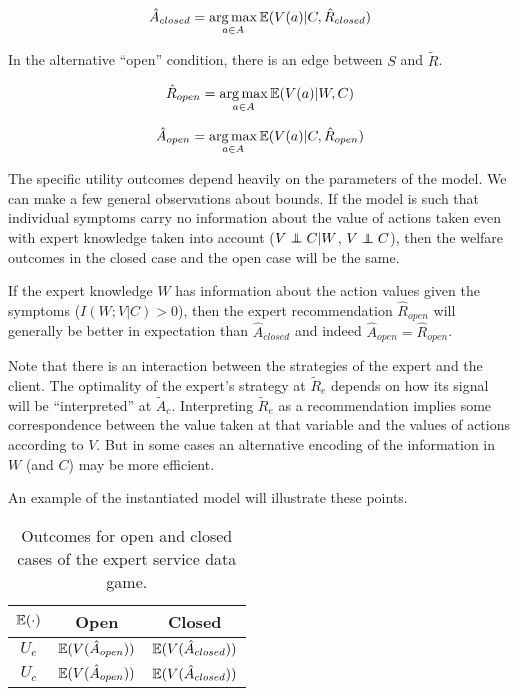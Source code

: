 \documentclass[../thesis.tex]{subfiles}
\begin{document}
$$\hat{A}_{closed} = \operatorname*{arg\,max}_{a \in A} \mathbb{E}(V(a) \vert C, \hat{R}_{closed})$$

In the alternative ``open'' condition, there is an edge between
$S$ and $\tilde{R}$.

$$\hat{R}_{open} = \operatorname*{arg\,max}_{a \in A} \mathbb{E}(V(a) \vert W,C)$$

$$\hat{A}_{open} = \operatorname*{arg\,max}_{a \in A} \mathbb{E}(V(a) \vert C, \hat{R}_{open})$$

The specific utility outcomes depend heavily on the parameters of
the model.
We can make a few general observations about bounds.
If the model is such that individual symptoms carry no
information about the value of actions taken even with expert
knowledge taken into account ($V \independent C \vert W$,
$V \independent C$),
then the welfare outcomes in the closed case and the open case will
be the same.

If the expert knowledge $W$ has information
about the action values given the symptoms ($I(W;V \vert C) > 0$),
then the expert recommendation $\hat{R}_{open}$ will generally be better
in expectation than $\hat{A}_{closed}$ and indeed
$\hat{A}_{open} = \hat{R}_{open}$.

Note that there is an interaction between the strategies of the
expert and the client.
The optimality of the expert's strategy at $\tilde{R}_e$ depends
on how its signal will be ``interpreted'' at $\tilde{A}_c$.
Interpreting $\tilde{R}_e$ as a recommendation implies some
correspondence between the value taken at that variable and
the values of actions according to $V$.
But in some cases an alternative encoding of the information
in $W$ (and $C$) may be more efficient.

An example of the instantiated model will illustrate these points.

\begin{table}
\begin{center}
\begin{tabular}{ |c|c|c| } 
 \hline
  $\mathbb{E}(\cdot)$ & Open  & Closed \\
 \hline
 $U_e$ & $\mathbb{E}(V(\hat{A}_{open}))$ & $\mathbb{E}(V(\hat{A}_{closed}))$ \\ 
 $U_c$ & $\mathbb{E}(V(\hat{A}_{open}))$ & $\mathbb{E}(V(\hat{A}_{closed}))$  \\
 \hline
\end{tabular}
\caption{Outcomes for open and closed cases of the expert service data game.}
\end{center}
\end{table}
\end{document}
